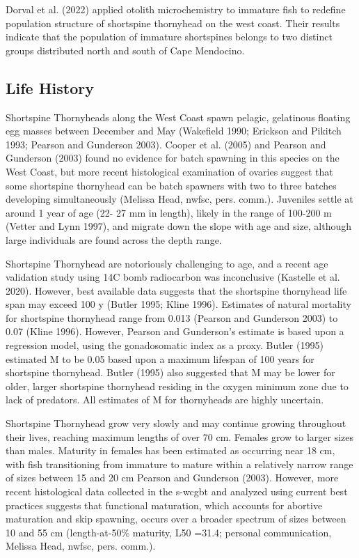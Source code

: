 \documentclass[11pt,
  english,
  letterpaper,
]{article}
\begin{document}
Dorval et al. (2022) applied otolith microchemistry to immature fish to redefine population structure of shortspine thornyhead on the west coast. Their results indicate that the population of immature shortspines belongs to two distinct groups distributed north and south of Cape Mendocino.

\hypertarget{life-history}{%
\subsection{Life History}\label{life-history}}

Shortspine Thornyheads along the West Coast spawn pelagic, gelatinous floating egg masses between December and May (Wakefield 1990; Erickson and Pikitch 1993; Pearson and Gunderson 2003). Cooper et al. (2005) and Pearson and Gunderson (2003) found no evidence for batch spawning in this species on the West Coast, but more recent histological examination of ovaries suggest that some shortspine thornyhead can be batch spawners with two to three batches developing simultaneously (Melissa Head, \gls{nwfsc}, pers. comm.). Juveniles settle at around 1 year of age (22- 27 mm in length), likely in the range of 100-200 m (Vetter and Lynn 1997), and migrate down the slope with age and size, although large individuals are found across the depth range.

Shortspine Thornyhead are notoriously challenging to age, and a recent age validation study using 14C bomb radiocarbon was inconclusive (Kastelle et al. 2020). However, best available data suggests that the shortspine thornyhead life span may exceed 100 y (Butler 1995; Kline 1996). Estimates of natural mortality for shortspine thornyhead range from 0.013 (Pearson and Gunderson 2003) to 0.07 (Kline 1996). However, Pearson and Gunderson's estimate is based upon a regression model, using the gonadosomatic index as a proxy. Butler (1995) estimated M to be 0.05 based upon a maximum lifespan of 100 years for shortspine thornyhead. Butler (1995) also suggested that M may be lower for older, larger shortspine thornyhead residing in the oxygen minimum zone due to lack of predators. All estimates of M for thornyheads are highly uncertain.

Shortspine Thornyhead grow very slowly and may continue growing throughout their lives, reaching maximum lengths of over 70 cm. Females grow to larger sizes than males. Maturity in females has been estimated as occurring near 18 cm, with fish transitioning from immature to mature within a relatively narrow range of sizes between 15 and 20 cm Pearson and Gunderson (2003). However, more recent histological data collected in the \gls{s-wcgbt} and analyzed using current best practices suggests that functional maturation, which accounts for abortive maturation and skip spawning, occurs over a broader spectrum of sizes between 10 and 55 cm (length-at-50\% maturity, L50 =31.4; personal communication, Melissa Head, \gls{nwfsc}, pers. comm.).
\end{document}
